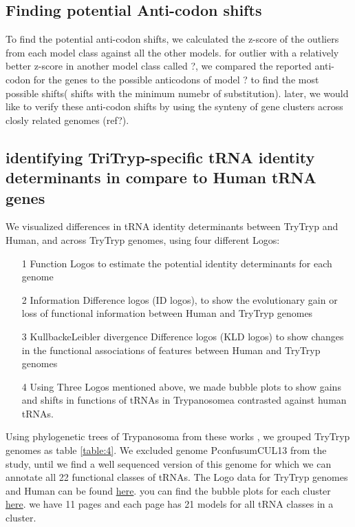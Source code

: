 \documentclass[
10pt, %
a4paper, %
oneside, %
headinclude,footinclude, %
BCOR5mm, %
]{scrartcl}
\begin{document}
\subsection{Finding potential Anti-codon shifts}
To find the potential anti-codon shifts, we calculated the z-score of the outliers from each model class against all the other models. for outlier with a relatively better z-score in another model class called ?, we compared the reported anti-codon for the genes to the possible anticodons of model ? to find the most possible shifts( shifts with the minimum numebr of substitution). later, we would like to verify these anti-codon shifts by using the synteny of gene clusters across closly related genomes (ref?).   

\subsection{identifying TriTryp-specific tRNA identity determinants in compare to Human tRNA genes}
We visualized differences in tRNA identity determinants between TryTryp and Human, and across TryTryp genomes, using four different Logos: 
\begin{enumerate}[noitemsep]

\item[1] Function Logos to estimate the potential identity determinants for each genome 
\item[2] Information Difference logos (ID logos), to show the evolutionary gain or loss of functional information between Human and TryTryp genomes 
\item[3] KullbackeLeibler divergence Difference logos (KLD logos) to show changes in the functional associations of features between Human and TryTryp genomes
\item[4] Using Three Logos mentioned above, we made bubble plots to show gains and shifts in functions of tRNAs in Trypanosomea contrasted against human tRNAs.

\end{enumerate}
Using phylogenetic trees of Trypanosoma from these works \cite{Souza:2018dg,Hughes:2003,Pothirat:2014,Kelly:2017}, we grouped TryTryp genomes as table \ref{table:4}. We excluded genome PconfusumCUL13 from the study, until we find a well sequenced version of this genome for which we can annotate all 22 functional classes of tRNAs. The Logo data for TryTryp genomes and Human can be found \href{https://github.com/fhadinezhadUC/Leishmania_2019/tree/master/Results/tsfmInput-output/output/Logos}{here}. you can find the bubble plots for each cluster \href{https://github.com/fhadinezhadUC/Leishmania_2019/tree/master/Results/tsfmInput-output/output/BubblePlots}{here}. we have 11 pages and each page has 21 models for all tRNA classes in a cluster. 
\end{document}
